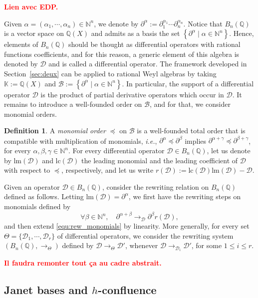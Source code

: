 \documentclass[10pt]{easychair}
\theoremstyle{definition}
\newtheorem{definition}[theorem]{Definition}
\newcommand\secTroisDeux{Janet bases and $h$-confluence}
\newcommand\ie{\emph{i.e.}}
\newcommand\todo[1]{{\bf\textcolor{red}{#1.}}}
\newcommand\diff[1]{\partial_{#1}}
\newcommand\D{\mathcal{D}}
\newcommand\lm{\text{lm}}
\newcommand\lc{\text{lc}}
\newcommand\basis{\mathscr{B}}
\newcommand\K{\mathbb{K}}
\newcommand\Q{\mathbb{Q}}
\newcommand\N{\mathbb{N}}
\newcommand\Weyl{B_n(\Q)}
\newcommand\rewTheta{\to_{\Theta}}
\begin{document}
\todo{Lien avec EDP}

Given $\alpha=(\alpha_1,\cdots,\alpha_n)\in\N^n$, we denote by 
$\partial^{\alpha}:=\diff{1}^{\alpha_1}\cdots\diff{n}^{\alpha_n}$. Notice
that $\Weyl$ is a vector space on $\Q(X)$ and admits as a basis the set
$\left\{\partial^\alpha\mid\alpha\in\N^n\right\}$. Hence, elements of
$\Weyl$ should be thought as differential operators with rational
functions coefficients, and for this reason, a generic element of this
algebra is denoted by $\D$ and is called a differential operator. The
framework developed in Section~\ref{sec:deux} can be applied to rational
Weyl algebras by taking $\K:=\Q(X)$ and
$\basis:=\left\{\partial^\alpha\mid\alpha\in\N^n\right\}$. In particular,
the support of a differential operator $\D$ is the product of partial
derivative operators which occur in $\D$. It remains to introduce a
well-founded order on $\basis$, and for that, we consider monomial
orders.

\begin{definition}
  A {\em monomial order} $\preceq$ on $\basis$ is a well-founded total
  order that is compatible with multiplication of monomials, \ie,
  $\partial^{\alpha}\preceq\partial^{\beta}$ implies 
  $\partial^{\alpha+\gamma}\preceq\partial^{\beta+\gamma}$, for every
  $\alpha,\beta,\gamma\in\N^n$. For every differential operator
  $\D\in\Weyl$, let us denote by $\lm(\D)$ and $\lc(\D)$ the leading
  monomial and the leading coefficient of $\D$ with respect to $\preceq$,
  respectively, and let us write $r(\D):=\lc(\D)\lm(\D)-\D$. 
\end{definition}

Given an operator $\D\in\Weyl$, consider the rewriting relation on
$\Weyl$ defined as follows. Letting $\lm(\D)=\partial^{\alpha}$, we first
have the rewriting steps on monomials defined by
\begin{equation}\label{equ:rew_monomials}
  \forall\beta\in\N^n,\quad\partial^{\alpha+\beta}
  \to_{\D}\partial^{\beta}r(\D),\end{equation}
and then extend \eqref{equ:rew_monomials} by linearity. More generally,
for every set $\Theta=\{\D_1,\cdots,\D_r\}$ of differential operators, we
consider the rewriting system $(\Weyl,\rewTheta)$ defined by
$\D\rewTheta\D'$, whenever $\D\to_{\D_i}\D'$, for some $1\leq i\leq r$.

\todo{Il faudra remonter tout ça au cadre abstrait}

\subsection{\secTroisDeux}\label{sec:troisDeux}
\end{document}
